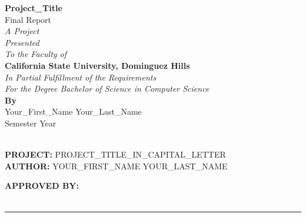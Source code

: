 \documentclass[12pt]{report}
\begin{document}


\doublespacing
{}
\begin{titlepage}
    \begin{center}
        \vspace*{2in}
        {\Large \textbf{Project\_Title}}\\[0.2cm]
        {\Large Final Report}\\[0.2cm]
        \textit{A Project}\\[0.2cm]
        \textit{Presented}\\[0.2cm]
        \textit{To the Faculty of}\\[0.2cm]
        \textbf{California State University, Dominguez Hills}\\[0.2cm]
        \textit{In Partial Fulfillment of the Requirements}\\[0.2cm]
        \textit{For the Degree Bachelor of Science in Computer Science}\\[2cm]
        \textbf{By}\\[0.2cm]
        Your\_First\_Name Your\_Last\_Name\\[0.2cm]
        Semester Year
    \end{center}
\end{titlepage}

\setcounter{page}{2} %

\newpage
{}
{}
\thispagestyle{empty}
\text{} \\
\textbf{PROJECT:} PROJECT\_TITLE\_IN\_CAPITAL\_LETTER\\[0.2cm]
\textbf{AUTHOR:} YOUR\_FIRST\_NAME YOUR\_LAST\_NAME

\vspace{6in}
\hfill \textbf{APPROVED BY:}\\ \\
\vspace{2cm}
\hfill \noindent\rule{6cm}{0.4pt}
\end{document}
